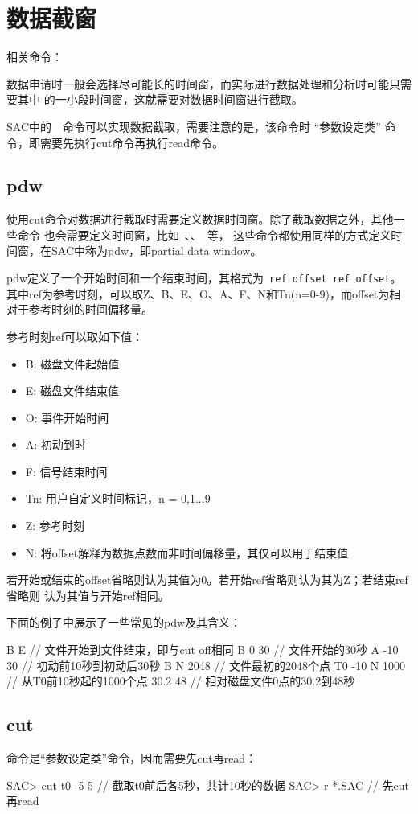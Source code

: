 \section{数据截窗}
相关命令：

数据申请时一般会选择尽可能长的时间窗，而实际进行数据处理和分析时可能只需要其中
的一小段时间窗，这就需要对数据时间窗进行截取。

SAC中的~~命令可以实现数据截取，需要注意的是，该命令时
``参数设定类'' 命令，即需要先执行cut命令再执行read命令。

\subsection{pdw}
\label{subsec:pdw}
使用cut命令对数据进行截取时需要定义数据时间窗。除了截取数据之外，其他一些命令
也会需要定义时间窗，比如~、、~等，
这些命令都使用同样的方式定义时间窗，在SAC中称为pdw，即partial data window。

pdw定义了一个开始时间和一个结束时间，其格式为~\verb+ref offset ref offset+。
其中ref为参考时刻，可以取Z、B、E、O、A、F、N和Tn(n=0-9)，而offset为相对于参考时刻的时间偏移量。

参考时刻ref可以取如下值：
\begin{itemize}
\item B: 磁盘文件起始值
\item E: 磁盘文件结束值
\item O: 事件开始时间
\item A: 初动到时
\item F: 信号结束时间
\item Tn: 用户自定义时间标记，n = 0,1...9
\item Z: 参考时刻
\item N: 将offset解释为数据点数而非时间偏移量，其仅可以用于结束值
\end{itemize}

若开始或结束的offset省略则认为其值为0。若开始ref省略则认为其为Z；若结束ref省略则
认为其值与开始ref相同。

下面的例子中展示了一些常见的pdw及其含义：
\begin{SACCode}
 B E            // 文件开始到文件结束，即与cut off相同
 B 0 30         // 文件开始的30秒
 A -10 30       // 初动前10秒到初动后30秒
 B N 2048       // 文件最初的2048个点
 T0 -10 N 1000  // 从T0前10秒起的1000个点
 30.2 48        // 相对磁盘文件0点的30.2到48秒
\end{SACCode}

\subsection{cut}
命令是``参数设定类''命令，因而需要先cut再read：
\begin{SACCode}
SAC> cut t0 -5 5        // 截取t0前后各5秒，共计10秒的数据
SAC> r *.SAC            // 先cut再read
\end{SACCode}

